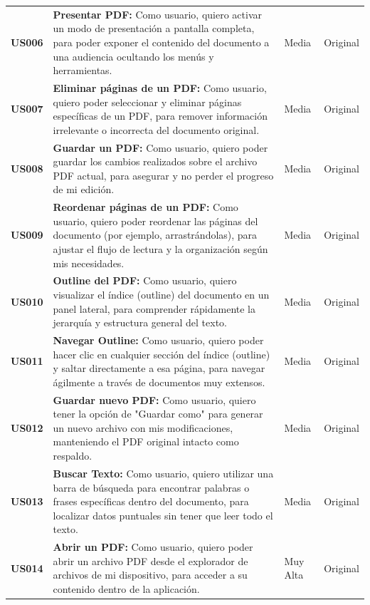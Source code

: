 \begin{longtable}{|l||p{7cm}|l|l|}
\textbf{US006} & 
\textbf{Presentar PDF:} Como usuario, quiero activar un modo de presentación a pantalla completa, para poder exponer el contenido del documento a una audiencia ocultando los menús y herramientas. & Media & Original\\

\textbf{US007} & 
\textbf{Eliminar páginas de un PDF:} Como usuario, quiero poder seleccionar y eliminar páginas específicas de un PDF, para remover información irrelevante o incorrecta del documento original. & Media & Original\\

\textbf{US008} & 
\textbf{Guardar un PDF:} Como usuario, quiero poder guardar los cambios realizados sobre el archivo PDF actual, para asegurar y no perder el progreso de mi edición. & Media & Original\\

\textbf{US009} & 
\textbf{Reordenar páginas de un PDF:} Como usuario, quiero poder reordenar las páginas del documento (por ejemplo, arrastrándolas), para ajustar el flujo de lectura y la organización según mis necesidades. & Media & Original\\

\textbf{US010} & 
\textbf{Outline del PDF:} Como usuario, quiero visualizar el índice (outline) del documento en un panel lateral, para comprender rápidamente la jerarquía y estructura general del texto. & Media & Original\\

\textbf{US011} & 
\textbf{Navegar Outline:} Como usuario, quiero poder hacer clic en cualquier sección del índice (outline) y saltar directamente a esa página, para navegar ágilmente a través de documentos muy extensos. & Media & Original\\

\textbf{US012} & 
\textbf{Guardar nuevo PDF:} Como usuario, quiero tener la opción de "Guardar como" para generar un nuevo archivo con mis modificaciones, manteniendo el PDF original intacto como respaldo. & Media & Original\\

\textbf{US013} & 
\textbf{Buscar Texto:} Como usuario, quiero utilizar una barra de búsqueda para encontrar palabras o frases específicas dentro del documento, para localizar datos puntuales sin tener que leer todo el texto. & Media & Original\\

\textbf{US014} & 
\textbf{Abrir un PDF:} Como usuario, quiero poder abrir un archivo PDF desde el explorador de archivos de mi dispositivo, para acceder a su contenido dentro de la aplicación. & Muy Alta & Original\\


\end{longtable}
